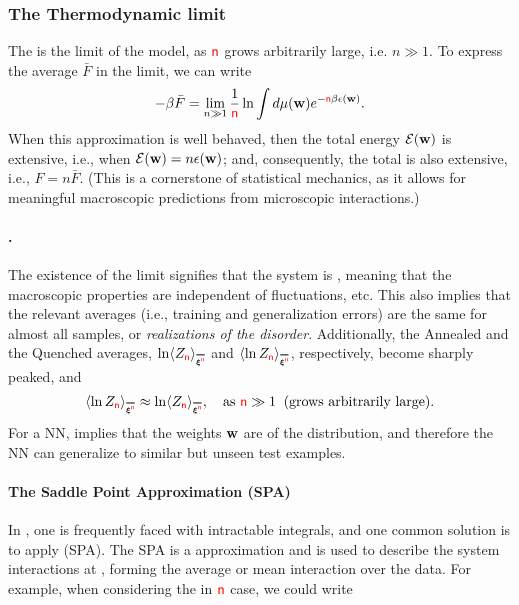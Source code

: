 \subsubsection{The Thermodynamic limit}
\label{sxn:largeN_and_SPA}
The \ThermodynamicLimit is the \LargeN limit of the model, as ${\color{red}\sf{n}}$ grows arbitrarily large, i.e. $n \gg 1$.
To express the average \FreeEnergy $\bar{F}$ in the \LargeN limit, we can write
\begin{align}
  -\beta\bar{F} = \lim_{n\gg 1}\frac{1}{{\color{red}\sf{n}}}\ln \int d\mu({\mathbf{w}}) e^{-{\color{red}\sf{n}}\beta\epsilon({\mathbf{w}})}  .
\end{align}
When this \LargeN approximation is well behaved,
then the total energy $\mathcal{E}(\mathbf{w})$ is extensive, i.e., when $\mathcal{E}(\mathbf{w})=n\epsilon({\mathbf{w}})$;
and, consequently, the total \FreeEnergy is also extensive, i.e., $F=n\bar{F}$.
(This is a cornerstone of statistical mechanics, as it allows for meaningful macroscopic predictions from microscopic interactions.)

\paragraph{\SelfAveraging.}
The existence of the limit signifies that the system is \emph{\SelfAveraging}, meaning that
the macroscopic properties are independent of fluctuations, etc.
This also implies that the relevant averages
(i.e., training and generalization errors) are the same for almost all samples, or \emph{realizations of the disorder}.
Additionally, the Annealed and the Quenched averages,
$\ln \langle Z_{\ND} \rangle_{\AVGNDXIn}$ and $\langle \ln Z_{\ND} \rangle_{\AVGNDXIn}$, respectively,
become sharply peaked, and
\begin{align}
\langle \ln Z_{\ND} \rangle_{\AVGNDXIn} \approx \ln \langle Z_{\ND} \rangle_{\AVGNDXIn}, \quad \text{as } \ND \gg 1\;\; \text{(grows arbitrarily large)}.
\end{align}
For a NN, \SelfAveraging implies that the weights ${\mathbf{w}}$ are \emph{\Typical} of the distribution,
and therefore the NN can generalize to similar but unseen test examples.

\paragraph{The Saddle Point Approximation (SPA) }In \STATMECH, one is frequently faced with intractable integrals, and one common solution is to apply \SaddlePointApproximation (SPA). The SPA is a \LargeN approximation and is used to describe the system interactions at \LargeN, forming the average or mean interaction over the data.
For example, when considering the \LargeN in ${\color{red}\sf{n}}$ case, we could write

